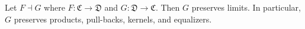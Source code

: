 Let $F \dashv G$ where $F : \mathfrak{C} \to \mathfrak{D}$ and $G : \mathfrak{D} \to \mathfrak{C}$. Then $G$ preserves limits. In particular, $G$ preserves products, pull-backs, kernels, and equalizers.
